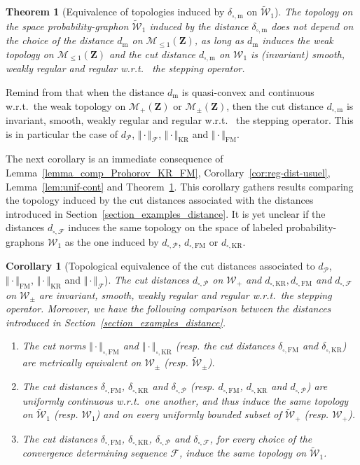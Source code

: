 \documentclass{amsart}
\newcommand{\wrt}{w.r.t.\ }
\theoremstyle{plain}
\newtheorem{theo}[Th]{Theorem}
\newtheorem{cor}[Th]{Corollary}
\theoremstyle{definition}
\newcommand{\Space}{\mathbf{Z}}
\newcommand{\signed}{\pm}
\newcommand{\SubProba}{\mathcal{M}_{\leq1}(\Space)}
\newcommand{\Meas}{\mathcal{M}_+(\Space)}
\newcommand{\SignedMeas}{\mathcal{M}_{\pm}(\Space)}
\newcommand{\Graphon}{\mathcal{W}_1}
\newcommand{\Kernel}{\mathcal{W}_{\signed}}
\newcommand{\Kernelp}{\mathcal{W}_{+}}
\newcommand{\UGraphon}{\widetilde{\mathcal{W}}_1}
\newcommand{\UKernel}{\widetilde{\mathcal{W}}_{\signed}}
\newcommand{\UKernelp}{\widetilde{\mathcal{W}}_{+}}
\newcommand{\m}{\mathrm{m}}
\newcommand{\dmeas}{d_\m}
\newcommand{\dcut}{d_{\square,\m}}
\newcommand{\ddcut}{\delta_{\square,\m}}
\newcommand{\NmeasFSymbol}{\Vert\cdot\Vert_{\mathcal{F}}}
\newcommand{\dcutF}{d_{\square,\mathcal{F}}}
\newcommand{\ddcutF}{\delta_{\square,\mathcal{F}}}
\newcommand{\F}{\mathcal{F}}
\newcommand{\dmeasP}{d_{\mathcal{P}}}
\newcommand{\dcutP}{d_{\square,\mathcal{P}}}
\newcommand{\ddcutP}{\delta_{\square,\mathcal{P}}}
\newcommand{\mKR}{\text{KR}}
\newcommand{\NmeasKRSymbol}{\Vert\cdot\Vert_{\mKR}}
\newcommand{\dcutKR}{d_{\square,\mKR}}
\newcommand{\NcutKRSymbol}{\Vert\cdot\Vert_{\square,\mKR}}
\newcommand{\ddcutKR}{\delta_{\square,\mKR}}
\newcommand{\mFM}{\text{FM}}
\newcommand{\NmeasFMSymbol}{\Vert\cdot\Vert_{\mFM}}
\newcommand{\dcutFM}{d_{\square,\mFM}}
\newcommand{\NcutFMSymbol}{\Vert\cdot\Vert_{\square,\mFM}}
\newcommand{\ddcutFM}{\delta_{\square,\mFM}}
\begin{document}
\begin{theo}[Equivalence of topologies induced by $\ddcut$ on $\UGraphon$]\label{theo_equiv_topo}
  The topology on  the space probability-graphon $\UGraphon$ induced by
  the distance $\ddcut$  does not depend on the choice  of the distance
  $\dmeas$ on $\SubProba$, as long
  as $\dmeas$ induces the weak  topology on $\SubProba$
  and the cut distance $\dcut$ on $\Graphon$
  is (invariant) smooth,  weakly regular and regular \wrt
  the stepping operator.
\end{theo}

	
Remind from  that when the distance
$\dmeas$ is quasi-convex and continuous \wrt the weak topology on $\Meas$ or $\SignedMeas$,
then the cut distance $\dcut$ is invariant, smooth,  weakly regular and regular \wrt
  the stepping operator.
This is in particular the case of $\dmeasP$, $\NmeasFSymbol$, $\NmeasKRSymbol$
	and $\NmeasFMSymbol$.

The next corollary is an immediate consequence of Lemma~\ref{lemma_comp_Prohorov_KR_FM},
Corollary~\ref{cor:reg-dist-usuel}, Lemma~\ref{lem:unif-cont} and Theorem~\ref{theo_equiv_topo}.
This corollary gathers results comparing the topology induced
	by the cut distances associated with the distances 
	introduced in Section~\ref{section_examples_distance}.
It is yet unclear if the  distances $\dcutF$ induces the same topology
on the space of labeled probability-graphons $\Graphon$ 
as the one induced by $\dcutP$, $\dcutFM$ or $\dcutKR$.

\begin{cor}[Topological equivalence of the cut distances associated to
	$\dmeasP$, $\NmeasFMSymbol$, $\NmeasKRSymbol$ and $\NmeasFSymbol$]
	\label{cor:equiv-topo}
The cut distances $\dcutP$ on $\Kernelp$ and $\dcutKR, \dcutFM$ and $\dcutF$ on $\Kernel$
	are invariant, smooth, weakly regular and regular \wrt the stepping operator.
Moreover, we have the following comparison between the distances
introduced in Section~\ref{section_examples_distance}.
\begin{enumerate}[label=(\roman*)]
\item\label{item:equiv-topo-norm}
The cut norms $\NcutFMSymbol$ and $\NcutKRSymbol$
(resp. the cut distances $\ddcutFM$ and $\ddcutKR$)
are metrically equivalent on $\Kernel$ (resp. $\UKernel$).


\item\label{item:equiv-topo-dP}
The cut distances $\ddcutFM$, $\ddcutKR$ and $\ddcutP$
(resp. $\dcutFM$, $\dcutKR$ and $\dcutP$)
are uniformly continuous \wrt one another,
and thus induce the same topology on $\UGraphon$ (resp. $\Graphon$)
and on every uniformly bounded subset of $\UKernelp$ (resp. $\Kernelp$).

\item\label{item:equiv-topo-dF}
The cut distances  $\ddcutFM$, $\ddcutKR$, $\ddcutP$ and $\ddcutF$, for every
 choice of the convergence determining sequence $\F$, induce the same
  topology  on  $\UGraphon$. 
\end{enumerate}
\end{cor}
\end{document}

